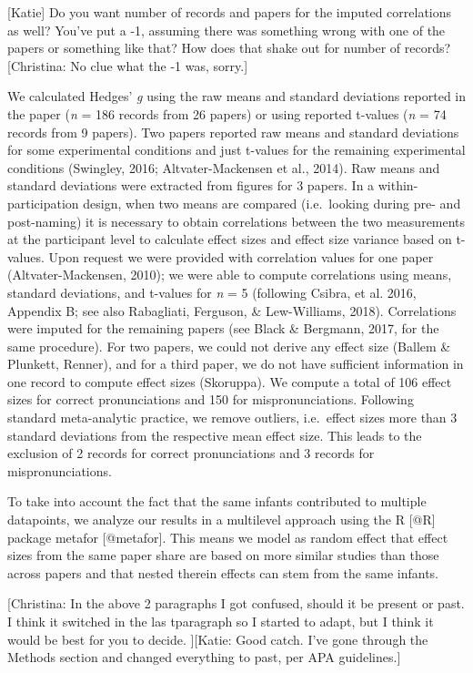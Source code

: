 \documentclass[man]{apa6}
\theoremstyle{definition}
\theoremstyle{definition}
\theoremstyle{definition}
\theoremstyle{remark}
\begin{document}
{[}Katie{]} Do you want number of records and papers for the imputed
correlations as well? You've put a -1, assuming there was something
wrong with one of the papers or something like that? How does that shake
out for number of records? {[}Christina: No clue what the -1 was,
sorry.{]}

We calculated Hedges' \emph{g} using the raw means and standard
deviations reported in the paper (\emph{n} = 186 records from 26 papers)
or using reported t-values (\emph{n} = 74 records from 9 papers). Two
papers reported raw means and standard deviations for some experimental
conditions and just t-values for the remaining experimental conditions
(Swingley, 2016; Altvater-Mackensen et al., 2014). Raw means and
standard deviations were extracted from figures for 3 papers. In a
within-participation design, when two means are compared (i.e.~looking
during pre- and post-naming) it is necessary to obtain correlations
between the two measurements at the participant level to calculate
effect sizes and effect size variance based on t-values. Upon request we
were provided with correlation values for one paper (Altvater-Mackensen,
2010); we were able to compute correlations using means, standard
deviations, and t-values for \emph{n} = 5 (following Csibra, et al.
2016, Appendix B; see also Rabagliati, Ferguson, \& Lew-Williams, 2018).
Correlations were imputed for the remaining papers (see Black \&
Bergmann, 2017, for the same procedure). For two papers, we could not
derive any effect size (Ballem \& Plunkett, Renner), and for a third
paper, we do not have sufficient information in one record to compute
effect sizes (Skoruppa). We compute a total of 106 effect sizes for
correct pronunciations and 150 for mispronunciations. Following standard
meta-analytic practice, we remove outliers, i.e.~effect sizes more than
3 standard deviations from the respective mean effect size. This leads
to the exclusion of 2 records for correct pronunciations and 3 records
for mispronunciations.

To take into account the fact that the same infants contributed to
multiple datapoints, we analyze our results in a multilevel approach
using the R {[}@R{]} package metafor {[}@metafor{]}. This means we model
as random effect that effect sizes from the same paper share are based
on more similar studies than those across papers and that nested therein
effects can stem from the same infants.

{[}Christina: In the above 2 paragraphs I got confused, should it be
present or past. I think it switched in the las tparagraph so I started
to adapt, but I think it would be best for you to decide. {]}{[}Katie:
Good catch. I've gone through the Methods section and changed everything
to past, per APA guidelines.{]}
\end{document}
